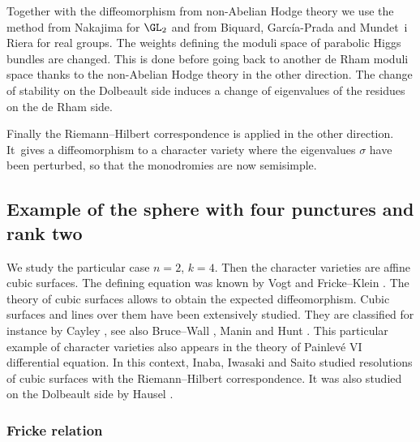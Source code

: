 Together with the diffeomorphism from non-Abelian Hodge theory we use the method from Nakajima \cite{Nakajima_1996} for $\GL_2$ and from Biquard, García-Prada and Mundet~i Riera \cite{Biquard_Garcia_Prada_Riera} for real groups. The weights defining the moduli space of parabolic Higgs bundles are changed. This is done before going back to another de Rham moduli space thanks to the non-Abelian Hodge theory in the other direction. The change of stability on the Dolbeault side induces a change of eigenvalues of the residues on the de Rham side.

Finally the Riemann--Hilbert correspondence is applied in the other direction. It~gives a diffeomorphism to a character variety where the eigenvalues $\sigma$ have been perturbed, so that the monodromies are now semisimple.

\subsection{Example of the sphere with four punctures and rank two}\label{sect_example_sphere}
We study the particular case $n=2$, $k=4$. Then the character varieties are affine cubic surfaces. The defining equation was known by Vogt \cite{Vogt} and Fricke--Klein \cite{Fricke_Klein}. The theory of cubic surfaces allows to obtain the expected diffeomorphism. Cubic surfaces and lines over them have been extensively studied. They are classified for instance by Cayley \cite{Cayley}, see also Bruce--Wall \cite{Bruce_cubic}, Manin \cite{Manin1986} and Hunt \cite{Hunt}. This particular example of character varieties also appears in the theory of Painlevé VI differential equation. In this context, Inaba, Iwasaki and Saito \cite{Inaba_Iwasaki_Saito,Inaba_Iwasaki_Saito_I,Inaba_Iwasaki_Saito_II} studied resolutions of cubic surfaces with the Riemann--Hilbert correspondence. It was also studied on the Dolbeault side by Hausel \cite{Hausel98}.

\subsubsection{Fricke relation}

